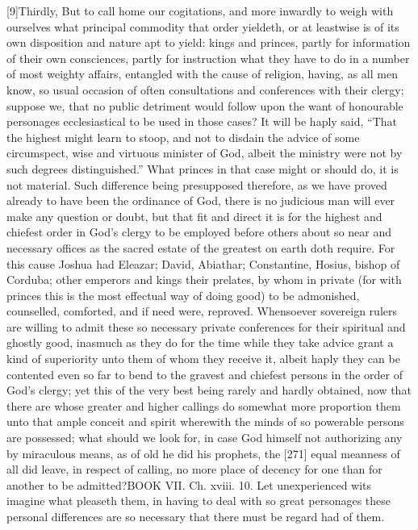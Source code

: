 [9]Thirdly, But to call home our cogitations, and more inwardly to weigh with ourselves what principal commodity that order yieldeth, or at leastwise is of its own disposition and nature apt to yield: kings and princes, partly for information of their own consciences, partly for instruction what they have to do in a number of most weighty affairs, entangled with the cause of religion, having, as all men know, so usual occasion of often consultations and conferences with their clergy; suppose we, that no public detriment would follow upon the want of honourable personages ecclesiastical to be used in those cases? It will be haply said, “That the highest might learn to stoop, and not to disdain the advice of some circumspect, wise and virtuous minister of God, albeit the ministry were not by such degrees distinguished.” What princes in that case might or should do, it is not material. Such difference being presupposed therefore, as we have proved already to have been the ordinance of God, there is no judicious man will ever make any question or doubt, but that fit and direct it is for the highest and chiefest order in God’s clergy to be employed before others about so near and necessary offices as the sacred estate of the greatest on earth doth require. For this cause Joshua had Eleazar; David, Abiathar; Constantine, Hosius, bishop of Corduba; other emperors and kings their prelates, by whom in private (for with princes this is the most effectual way of doing good) to be admonished, counselled, comforted, and if need were, reproved. Whensoever sovereign rulers are willing to admit these so necessary private conferences for their spiritual and ghostly good, inasmuch as they do for the time while they take advice grant a kind of superiority unto them of whom they receive it, albeit haply they can be contented even so far to bend to the gravest and chiefest persons in the order of God’s clergy; yet this of the very best being rarely and hardly obtained, now that there are whose greater and higher callings do somewhat more proportion them unto that ample conceit and spirit wherewith the minds of so powerable persons are possessed; what should we look for, in case God himself not authorizing any by miraculous means, as of old he did his prophets, the [271] equal meanness of all did leave, in respect of calling, no more place of decency for one than for another to be admitted?BOOK VII. Ch. xviii. 10. Let unexperienced wits imagine what pleaseth them, in having to deal with so great personages these personal differences are so necessary that there must be regard had of them.

